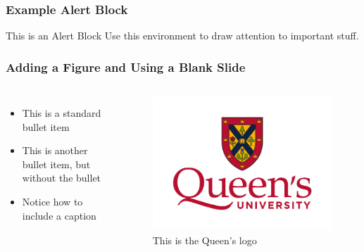 \documentclass[fleqn]{qu-slides}
\begin{document}

\SlideWhite
\begin{frame}[fragile]
    \frametitle{Example Alert Block}
    \begin{alertblock}{This is an Alert Block}
        Use this environment to draw attention to important stuff.
    \end{alertblock}
\end{frame}


\SlideWhite
\begin{frame}
    \frametitle{Adding a Figure and Using a Blank Slide}
    \begin{columns}
        \begin{itemize}
            \item This is a standard bullet item
            \item[] This is another bullet item, but without the bullet
            \item Notice how to include a caption
        \end{itemize}
        \begin{figure}
            \flushleft
            \includegraphics[width=1.0\columnwidth]{logo/qu-logo-vertical-colour.pdf}
            \caption{This is the Queen's logo}
        \end{figure}
    \end{columns}
\end{frame}
\end{document}

